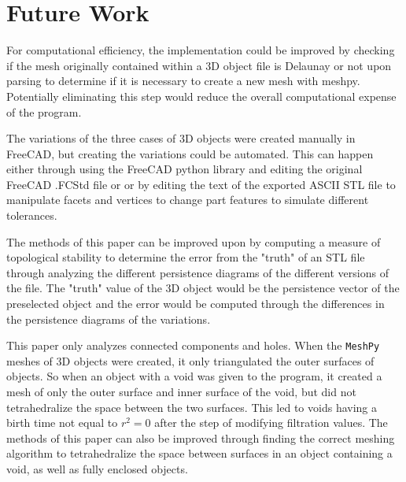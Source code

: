 \documentclass[ma]{uncgdissertationexp}
\theoremstyle{plain}
\theoremstyle{definition}
\theoremstyle{remark}
\begin{document}
\section{Future Work}
\par For computational efficiency, the implementation could be improved by checking if the mesh originally contained within a 3D object file is Delaunay or not upon parsing to determine if it is necessary to create a new mesh with meshpy. Potentially eliminating this step would reduce the overall computational expense of the program.
\par The variations of the three cases of 3D objects were created manually in FreeCAD, but creating the variations could be automated. This can happen either through using the FreeCAD python library and editing the original FreeCAD .FCStd file or or by editing the text of the exported ASCII STL file to manipulate facets and vertices to change part features to simulate different tolerances.
\par The methods of this paper can be improved upon by computing a measure of topological stability to determine the error from the "truth" of an STL file through analyzing the different persistence diagrams of the different versions of the file. The "truth" value of the 3D object would be the persistence vector of the preselected object and the error would be computed through the differences in the persistence diagrams of the variations.
\par This paper only analyzes connected components and holes. When the \verb"MeshPy" meshes of 3D objects were created, it only triangulated the outer surfaces of objects. So when an object with a void was given to the program, it created a mesh of only the outer surface and inner surface of the void, but did not tetrahedralize the space between the two surfaces. This led to voids having a birth time not equal to $r^{2}=0$ after the step of modifying filtration values. The methods of this paper can also be improved through finding the correct meshing algorithm to tetrahedralize the space between surfaces in an object containing a void, as well as fully enclosed objects.



\backmatter
\end{document}
